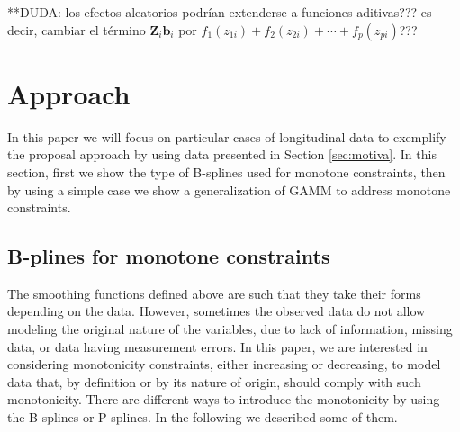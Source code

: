 \documentclass[11pt,letterpaper]{article}
\begin{document}
**DUDA: los efectos aleatorios podr\'ian extenderse a funciones aditivas??? es decir, cambiar el t\'ermino $\boldsymbol{Z}_i\boldsymbol{b}_i $ por  $f_1(z_{1i})+ f_2(z_{2i})+\cdots+ f_p(z_{pi})$???





\section{Approach}\label{sec:approach} 

 In this paper we will focus on particular cases of longitudinal data to exemplify the proposal approach by using data presented in Section \ref{sec:motiva}.  
 In this section, first we show the type of B-splines used for monotone constraints, then by using a simple case we show a  generalization of GAMM to address monotone constraints. 
 

\subsection{B-plines for monotone constraints}

The smoothing functions defined above are such that  they take their forms depending on the data. 
However, sometimes the observed data do not allow modeling the original nature of the variables, due to lack of information, missing data, or data having measurement errors.
In this paper, we are interested in considering monotonicity constraints, either increasing or decreasing, to model data that,  by definition or by its nature of origin, should comply with such monotonicity. 
There are different ways to introduce the monotonicity by using the B-splines or P-splines. In the following we described some of them. 


\end{document}
